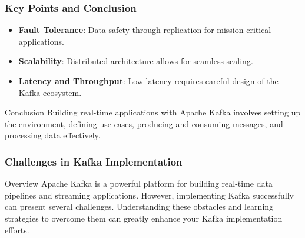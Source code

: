 \documentclass[aspectratio=169]{beamer}
\begin{document}
\begin{frame}
    \frametitle{Key Points and Conclusion}
    \begin{itemize}
        \item \textbf{Fault Tolerance}: Data safety through replication for mission-critical applications.
        \item \textbf{Scalability}: Distributed architecture allows for seamless scaling.
        \item \textbf{Latency and Throughput}: Low latency requires careful design of the Kafka ecosystem.
    \end{itemize}
    \begin{block}{Conclusion}
        Building real-time applications with Apache Kafka involves setting up the environment, defining use cases, producing and consuming messages, and processing data effectively.
    \end{block}
\end{frame}

\begin{frame}[fragile]
    \frametitle{Challenges in Kafka Implementation}
    \begin{block}{Overview}
        Apache Kafka is a powerful platform for building real-time data pipelines and streaming applications. However, implementing Kafka successfully can present several challenges. Understanding these obstacles and learning strategies to overcome them can greatly enhance your Kafka implementation efforts.
    \end{block}
\end{frame}
\end{document}
